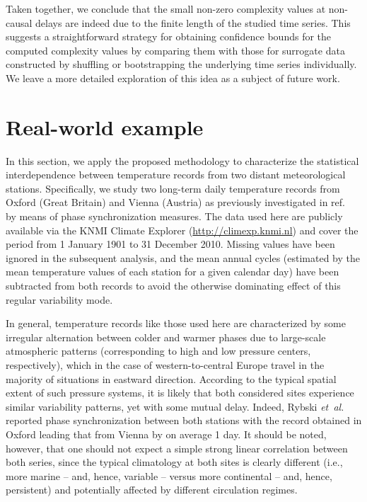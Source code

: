 \documentclass[12pt,aip,cha,reprint,nofootinbib]{revtex4-1}
\begin{document}
Taken together, we conclude that the small non-zero {\color{red}complexity} values at non-causal delays are indeed due to the finite length of the studied time series. This suggests a straightforward strategy for obtaining confidence bounds for the computed {\color{red}complexity} values by comparing them with those for surrogate data constructed by shuffling or bootstrapping the underlying time series individually. We leave a more detailed exploration of this idea as a subject of future work.


\section{Real-world example}  \label{sec:exp}
In this section, we apply the proposed methodology to characterize the statistical interdependence between temperature records from two distant meteorological stations. Specifically, we study two long-term daily temperature records from Oxford (Great Britain) and Vienna (Austria) as previously investigated in ref.~\cite{Rybski2003} by means of phase synchronization measures. The data used here are publicly available via the KNMI Climate Explorer (\url{http://climexp.knmi.nl}) and cover the period from 1 January 1901 to 31 December 2010. Missing values have been ignored in the subsequent analysis, and the mean annual cycles (estimated by the mean temperature values of each station for a given calendar day) have been subtracted from both records to avoid the otherwise dominating effect of this regular variability mode. 

In general, temperature records like those used here are characterized by some irregular alternation between colder and warmer phases due to large-scale atmospheric patterns (corresponding to high and low pressure centers, respectively), which in the case of western-to-central Europe travel in the majority of situations in eastward direction. According to the typical spatial extent of such pressure systems, it is likely that both considered sites experience similar variability patterns, yet with some mutual delay. Indeed, Rybski \emph{et~al.}~\cite{Rybski2003} reported phase synchronization between both stations with the record obtained in Oxford leading that from Vienna by on average 1 day. It should be noted, however, that one should not expect a simple strong linear correlation between both series, since the typical climatology at both sites is clearly different (i.e., more marine -- and, hence, variable -- versus more continental -- and, hence, persistent) and potentially affected by different circulation regimes.
\end{document}
